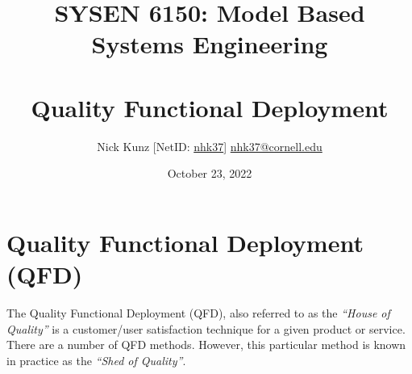 \documentclass{article}
\begin{document}
\title{SYSEN 6150: Model Based Systems Engineering\\~\\
    \Large Quality Functional Deployment
}
\author{
    Nick Kunz [NetID: \url{nhk37}] \hyperlink{nhk37@cornell.edu}{nhk37@cornell.edu}
}
\date{October 23, 2022}
\maketitle
\thispagestyle{fancy}

\section*{Quality Functional Deployment (QFD)}

The Quality Functional Deployment (QFD), also referred to as the \textit{``House of Quality''} is a customer/user satisfaction technique for a given product or service. There are a number of QFD methods. However, this particular method is known in practice as the \textit{``Shed of Quality''}.\\
\end{document}
